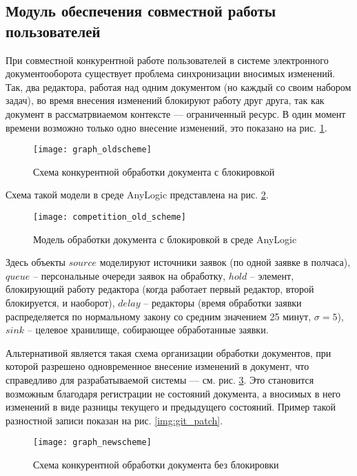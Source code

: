 \subsection{Модуль обеспечения совместной работы пользователей} \label{research_competition}

При совместной конкурентной работе пользователей в системе электронного документооборота существует проблема синхронизации вносимых изменений. Так, два редактора, работая над одним документом (но каждый со своим набором задач), во время внесения изменений блокируют работу друг друга, так как документ в рассматрвиаемом контексте --- ограниченный ресурс. В один момент времени возможно только одно внесение изменений, это показано на рис. \ref{img:graph_oldscheme}.
\begin{figure}[h!]
  \centering
  \texttt{[image: graph\_oldscheme]}
  \caption{Схема конкурентной обработки документа с блокировкой}
  \label{img:graph_oldscheme}
\end{figure}

\vspace{\baselineskip}
Схема такой модели в среде AnyLogic представлена на рис. \ref{img:competition_old_scheme}.
\begin{figure}[h!]
  \centering
  \texttt{[image: competition\_old\_scheme]}
  \caption{Модель обработки документа с блокировкой в среде AnyLogic}
  \label{img:competition_old_scheme}
\end{figure}

Здесь объекты $source$ моделируют источники заявок (по одной заявке в полчаса), $queue$ -- персональные очереди заявок на обработку, $hold$ -- элемент, блокирующий работу редактора (когда работает первый редактор, второй блокируется, и наоборот), $delay$ -- редакторы (время обработки заявки распределяется по нормальному закону со средним значением 25 минут, $\sigma=5$), $sink$ -- целевое хранилище, собирающее обработанные заявки.

\vspace{\baselineskip}
Альтернативой является такая схема организации обработки документов, при которой разрешено одновременное внесение изменений в документ, что справедливо для разрабатываемой системы --- см. рис. \ref{img:graph_newscheme}. Это становится возможным благодаря регистрации не состояний документа, а вносимых в него изменений в виде разницы текущего и предыдущего состояний. Пример такой разностной записи показан на рис. \ref{img:git_patch}.

\begin{figure}[h!]
  \centering
  \texttt{[image: graph\_newscheme]}
  \caption{Схема конкурентной обработки документа без блокировки}
  \label{img:graph_newscheme}
\end{figure}

